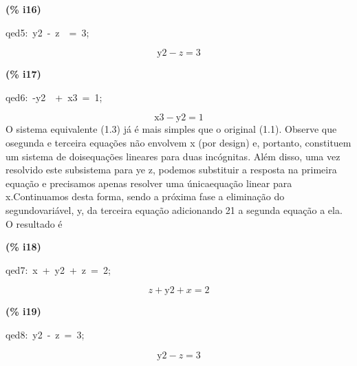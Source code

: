 \documentclass[fleqn]{article}
\begin{document}
\noindent
\begin{minipage}[t]{4.000000em}\color{red}\bfseries
(\% i16)	
\end{minipage}
\begin{minipage}[t]{\textwidth}\color{blue}
qed5:\ y2\ -\ z\ \ =\ 3;
\end{minipage}
\[\displaystyle \tag{qed5} 
\ensuremath{\mathrm{y2}}\mathop{-}z\mathop{=}3\mbox{}
\]


\noindent
\begin{minipage}[t]{4.000000em}\color{red}\bfseries
(\% i17)	
\end{minipage}
\begin{minipage}[t]{\textwidth}\color{blue}
qed6:\ -y2\ \ +\ x3\ =\ 1;
\end{minipage}
\[\displaystyle \tag{qed6} 
\ensuremath{\mathrm{x3}}\mathop{-}\ensuremath{\mathrm{y2}}\mathop{=}1\mbox{}
\]
O sistema equivalente (1.3) já é mais simples que o original (1.1). Observe que osegunda e terceira equações não envolvem x (por design) e, portanto, constituem um sistema de doisequações lineares para duas incógnitas. Além disso, uma vez resolvido este subsistema para ye z, podemos substituir a resposta na primeira equação e precisamos apenas resolver uma únicaequação linear para x.Continuamos desta forma, sendo a próxima fase a eliminação do segundovariável, y, da terceira equação adicionando 21 a segunda equação a ela. O resultado é


\noindent
\begin{minipage}[t]{4.000000em}\color{red}\bfseries
(\% i18)	
\end{minipage}
\begin{minipage}[t]{\textwidth}\color{blue}
qed7:\ x\ +\ y2\ +\ z\ =\ 2;
\end{minipage}
\[\displaystyle \tag{qed7} 
z\mathop{+}\ensuremath{\mathrm{y2}}\mathop{+}x\mathop{=}2\mbox{}
\]


\noindent
\begin{minipage}[t]{4.000000em}\color{red}\bfseries
(\% i19)	
\end{minipage}
\begin{minipage}[t]{\textwidth}\color{blue}
qed8:\ y2\ -\ z\ =\ 3;
\end{minipage}
\[\displaystyle \tag{qed8} 
\ensuremath{\mathrm{y2}}\mathop{-}z\mathop{=}3\mbox{}
\]
\end{document}
